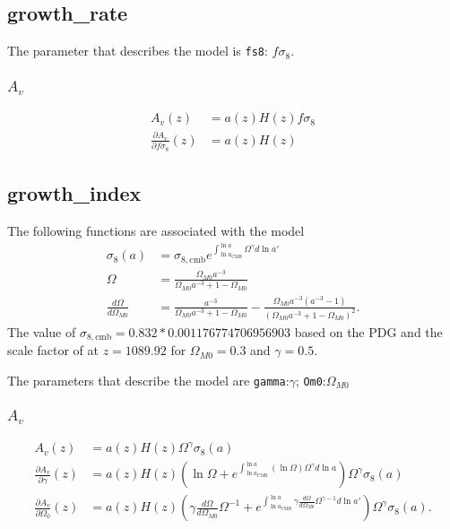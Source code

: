 \documentclass{article}
\begin{document}
\subsection{growth\_rate}

The parameter that describes the model is
{\tt fs8}: $f\sigma_8$.

\subsubsection{$A_v$}
\begin{align}
A_{v}(z) & = a(z) H(z) f\sigma_8 \\
\frac{\partial A_{v}}{\partial f\sigma_8} (z) & = a(z) H(z)
\end{align}

\subsection{growth\_index}
The following functions are associated with the model
\begin{align}
\sigma_8(a) & = \sigma_{8,\text{cmb}}  e^{\int^{\ln{a}}_{\ln{a_\text{CMB}}} \Omega^\gamma d\ln{a'}} \\
\Omega & = \frac{\Omega_{M0} a^{-3}}{\Omega_{M0} a^{-3} + 1 - \Omega_{M0}}\\
\frac{d\Omega}{d\Omega_{M0}} & = \frac{a^{-3}}{\Omega_{M0} a^{-3} + 1 - \Omega_{M0}} - \frac{\Omega_{M0} a^{-3}(a^{-3}-1)}{(\Omega_{M0} a^{-3} + 1 - \Omega_{M0})^2}.
\end{align}
The value of $ \sigma_{8,\text{cmb}}= 0.832 * 0.001176774706956903$ based on the PDG and the scale factor
of at $z=1089.92$ for $\Omega_{M0}=0.3$ and $\gamma=0.5$.

The parameters that describe the model are {\tt gamma}:$\gamma$; {\tt Om0}:$\Omega_{M0}$

\subsubsection{$A_v$}

\begin{align}
A_{v}(z) & =a(z) H(z) \Omega^\gamma  \sigma_8(a) \\
\frac{\partial A_{v}}{\partial \gamma} (z) & = a(z) H(z)
\left( \ln{\Omega}   + 
 e^{\int^{\ln{a}}_{\ln{a_\text{CMB}}}\left( \ln{\Omega} \right) \Omega^\gamma d\ln{a}}
\right) \Omega^\gamma  \sigma_8(a) \\
\frac{\partial A_{v}}{\partial \Omega_0} (z) & =a(z)  H(z) 
\left( \gamma  \frac{d\Omega}{d\Omega_{M0}} \Omega^{-1}  + 
 e^{\int^{\ln{a}}_{\ln{a_\text{CMB}}}\gamma \frac{d\Omega}{d\Omega_{M0}} \Omega^{\gamma-1} d\ln{a'}}
\right) \Omega^\gamma  \sigma_8(a).
\end{align}
\end{document}
